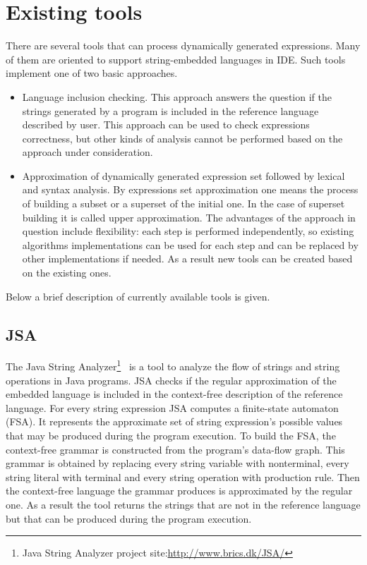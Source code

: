 \documentclass{sig-alternate-05-2015}
\begin{document}
\section{Existing tools}

There are several tools that can process dynamically generated expressions. Many of them are oriented to support string-embedded languages in IDE. Such tools implement one of two basic approaches. 
\begin{itemize}
\item{Language inclusion checking. This approach answers the question if the strings generated by a program is included in the reference language described by user. This approach can be used to check expressions correctness, but other kinds of analysis cannot be performed based on the approach under consideration.  }
\item{Approximation of dynamically generated expression set followed by lexical and syntax analysis. By expressions set approximation one means the process of building a subset or a superset of the initial one. In the case of superset building it is called upper approximation. The advantages of the approach in question include flexibility: each step is performed independently, so existing algorithms implementations can be used for each step and can be replaced by other implementations if needed. As a result new tools can be created based on the existing ones.}
\end{itemize}

Below a brief description of currently available tools is given.

\subsection{JSA}
The Java String Analyzer\footnote{Java String Analyzer project site:\url{http://www.brics.dk/JSA/}}~\cite{JSA:ref} is a tool to analyze the flow of strings and string operations in Java programs. JSA checks if the regular approximation of the embedded language is included in the context-free description of the reference language. For every string expression JSA computes a finite-state automaton (FSA). It represents the approximate set of string expression's possible values that may be produced during the program execution. To build the FSA, the context-free grammar is constructed from the program's data-flow graph. This grammar is obtained by replacing every string variable with nonterminal, every string literal with terminal and every string operation with production rule. Then the context-free language the grammar produces is approximated by the regular one. As a result the tool returns the strings that are not in the reference language but that can be produced during the program execution.
\end{document}
